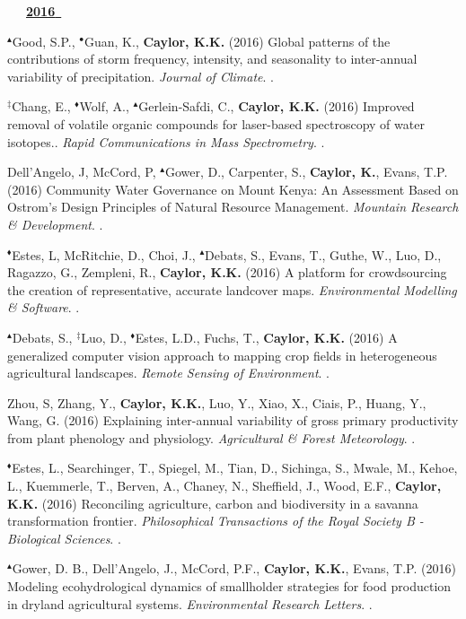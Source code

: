 \begin{etaremune}
\vspace{0.1in}
\mbox{\ \ \ \underline{\textbf{2016 }}}
\vspace{0.1in}

\item $^{\blacktriangle}$Good, S.P., $^{\bullet}$Guan, K., \textbf{ Caylor, K.K.} (2016) Global patterns of the contributions of storm frequency, intensity, and seasonality to inter-annual variability of precipitation. \emph{Journal of Climate}. .
\item $^{\ddagger}$Chang, E., $^{\blacklozenge}$Wolf, A., $^{\blacktriangle}$Gerlein-Safdi, C., \textbf{ Caylor, K.K.} (2016) Improved removal of volatile organic compounds for laser-based spectroscopy of water isotopes.. \emph{Rapid Communications in Mass Spectrometry}. .
\item Dell'Angelo, J, McCord, P, $^{\blacktriangle}$Gower, D., Carpenter, S., \textbf{ Caylor, K.}, Evans, T.P. (2016) Community Water Governance on Mount Kenya: An Assessment Based on Ostrom's Design Principles of Natural Resource Management. \emph{Mountain Research \& Development}. .
\item $^{\blacklozenge}$Estes, L, McRitchie, D., Choi, J., $^{\blacktriangle}$Debats, S., Evans, T., Guthe, W., Luo, D., Ragazzo, G., Zempleni, R., \textbf{ Caylor, K.K.} (2016) A platform for crowdsourcing the creation of representative, accurate landcover maps. \emph{Environmental Modelling \& Software}. .
\item $^{\blacktriangle}$Debats, S., $^{\ddagger}$Luo, D., $^{\blacklozenge}$Estes, L.D., Fuchs, T., \textbf{ Caylor, K.K.} (2016) A generalized computer vision approach to mapping crop fields in heterogeneous agricultural landscapes. \emph{Remote Sensing of Environment}. .
\item Zhou, S, Zhang, Y., \textbf{ Caylor, K.K.}, Luo, Y., Xiao, X., Ciais, P., Huang, Y., Wang, G. (2016) Explaining inter-annual variability of gross primary productivity from plant phenology and physiology. \emph{Agricultural \& Forest Meteorology}. .
\item $^{\blacklozenge}$Estes, L., Searchinger, T., Spiegel, M., Tian, D., Sichinga, S., Mwale, M., Kehoe, L., Kuemmerle, T., Berven, A., Chaney, N., Sheffield, J., Wood, E.F., \textbf{ Caylor, K.K.} (2016) Reconciling agriculture, carbon and biodiversity in a savanna transformation frontier. \emph{Philosophical Transactions of the Royal Society B - Biological Sciences}. .
\item $^{\blacktriangle}$Gower, D. B., Dell'Angelo, J., McCord, P.F., \textbf{ Caylor, K.K.}, Evans, T.P. (2016) Modeling ecohydrological dynamics of smallholder strategies for food production in dryland agricultural systems. \emph{Environmental Research Letters}. .


\end{etaremune}

